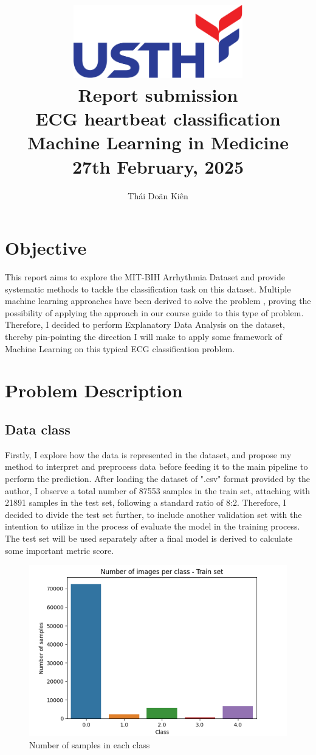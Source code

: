 \documentclass[a4paper,12pt]{article}
\title{
    \vspace{2cm} %
    \includegraphics[width=0.55\textwidth]{logo-usth.jpg} \\ %
    \vspace{1cm} %
    \textbf{\Huge Report submission\\ ECG heartbeat classification } \\
    \vspace{1cm} %
    \large Machine Learning in Medicine \\
    \vspace{0.5cm} %
    \large 27th February, 2025
}
\author{Thái Doãn Kiên}
\date{}
\begin{document}
\maketitle
\thispagestyle{empty}
\newpage

\setcounter{page}{1}  %
\tableofcontents
\newpage

\section{Objective}
This report aims to explore the MIT-BIH Arrhythmia Dataset and provide systematic methods to tackle the classification task on this dataset. Multiple machine learning approaches have been derived to solve the problem \cite{Kachuee_2018} \cite{odugoudar2024ecgclassificationarrhythmiadetection}, proving the possibility of applying the approach in our course guide to this type of problem. Therefore, I decided to perform Explanatory Data Analysis on the dataset, thereby pin-pointing the direction I will make to apply some framework of Machine Learning on this typical ECG classification problem.

\section{Problem Description}
\subsection{Data class}
Firstly, I explore how the data is represented in the dataset, and propose my method to interpret and preprocess data before feeding it to the main pipeline to perform the prediction. After loading the dataset of ".csv" format provided by the author, I observe a total number of 87553 samples in the train set, attaching with 21891 samples in the test set, following a standard ratio of 8:2. Therefore, I decided to divide the test set further, to include another validation set with the intention to utilize in the process of evaluate the model in the training process. The test set will be used separately after a final model is derived to calculate some important metric score.

\begin{figure}[b]
    \centering
    \includegraphics[width=0.5\linewidth]{sample_class.png}
    \caption{Number of samples in each class}
    \label{fig:fig1}
\end{figure}
\end{document}
